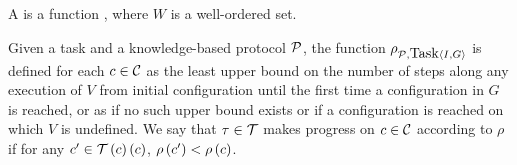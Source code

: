 \begin{defi}
A   is a function , where $W$ is a well-ordered set.
\cite{conf/ijcai/BrafmanS95}
\end{defi}

\begin{defi}
Given a task  and a knowledge-based protocol $\mathcal{P}$, the function $\rho_{\mathcal{P},\mbox{Task}\left\langle I,G\right\rangle}$ is defined for each $c\in\mathcal{C}$ as the least upper bound on the number of steps along any execution of $V$ from initial configuration  until the first time a configuration in $G$ is reached, or as if no such upper bound exists or if a configuration is reached on which $V$ is undefined. We say that $\tau\in\mathcal{T}$ makes progress on $c\in\mathcal{C}$ according to $\rho$ if for any $c'\in\mathcal{T}\left(c\right)\left( c\right)$, $\rho\left(c'\right)<\rho\left(c\right)$.
\cite{conf/ijcai/BrafmanS95}
\end{defi}